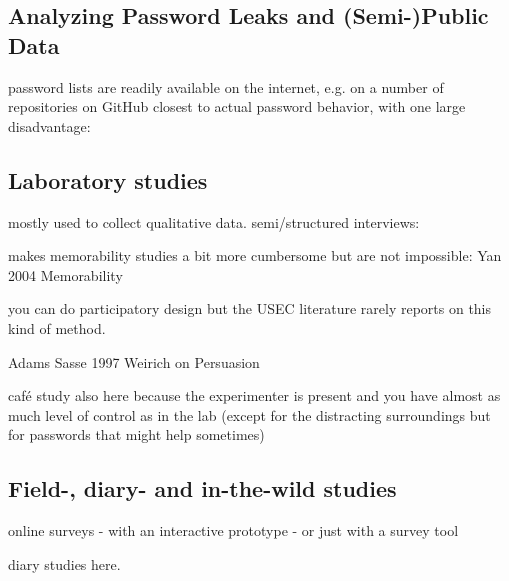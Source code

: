 \subsection{Analyzing Password Leaks and (Semi-)Public Data}
password lists are readily available on the internet, e.g. on a number of repositories on GitHub
closest to actual password behavior, with one large disadvantage: 
\cite{Bonneau2012LinguisticProperties}
\cite{Bonneau2012ScienceOfGuessing}
\cite{Veras2012VisualizingSemanticsPasswords}
\cite{Wash2016UnderstandingPasswordChoices}


\subsection{Laboratory studies}
mostly used to collect qualitative data.
semi/structured interviews: \cite{Stobert2014PasswordLifeCycle}

makes memorability studies a bit more cumbersome but are not impossible:
Yan 2004 Memorability \cite{Yan2004PasswordMemorabilitySecurity}


you can do participatory design \cite{Kuhn1993ParticipatoryDesign} but the USEC literature rarely reports on this kind of method.

Adams Sasse 1997 \cite{Adams1997MakingPWsSecureAndUsable}
Weirich on Persuasion \cite{Weirich2001PrettyGoodPersuasion, Weirich2005PersuasivePasswordSecurity}

café study also here because the experimenter is present and you have almost as much level of control as in the lab (except for the distracting surroundings but for passwords that might help sometimes)
\cite{VonZezschwitz2013SurvivalShortest}

\subsection{Field-, diary- and in-the-wild studies}

online surveys 
- with an interactive prototype 
- or just with a survey tool




diary studies here.  \cite{Hayashi2011DiaryStudyPWs}

